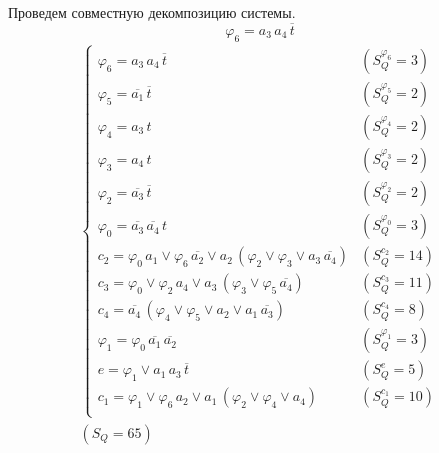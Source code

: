 \documentclass{article}
\begin{document}
\noindent\begin{minipage}{\textwidth}
Проведем совместную декомпозицию системы. \[\varphi_{6} = a_3\,a_4\,\overline{t}\]
\[\begin{matrix}
    \begin{cases}
        \varphi_{6} = a_3\,a_4\,\overline{t} & (S_Q^{\varphi_{6}} = 3) \\
        \varphi_{5} = \overline{a_1}\,\overline{t} & (S_Q^{\varphi_{5}} = 2) \\
        \varphi_{4} = a_3\,t & (S_Q^{\varphi_{4}} = 2) \\
        \varphi_{3} = a_4\,t & (S_Q^{\varphi_{3}} = 2) \\
        \varphi_{2} = \overline{a_3}\,\overline{t} & (S_Q^{\varphi_{2}} = 2) \\
        \varphi_{0} = \overline{a_3}\,\overline{a_4}\,t & (S_Q^{\varphi_{0}} = 3) \\
        c_2 = \varphi_{0}\,a_1 \lor \varphi_{6}\,\overline{a_2} \lor a_2\,\left(\varphi_{2} \lor \varphi_{3} \lor a_3\,\overline{a_4}\right) & (S_Q^{c_2} = 14) \\
        c_3 = \varphi_{0} \lor \varphi_{2}\,a_4 \lor a_3\,\left(\varphi_{3} \lor \varphi_{5}\,\overline{a_4}\right) & (S_Q^{c_3} = 11) \\
        c_4 = \overline{a_4}\,\left(\varphi_{4} \lor \varphi_{5} \lor a_2 \lor a_1\,\overline{a_3}\right) & (S_Q^{c_4} = 8) \\
        \varphi_{1} = \varphi_{0}\,\overline{a_1}\,\overline{a_2} & (S_Q^{\varphi_{1}} = 3) \\
        e = \varphi_{1} \lor a_1\,a_3\,\overline{t} & (S_Q^{e} = 5) \\
        c_1 = \varphi_{1} \lor \varphi_{6}\,a_2 \lor a_1\,\left(\varphi_{2} \lor \varphi_{4} \lor a_4\right) & (S_Q^{c_1} = 10) \\
    \end{cases} \\ (S_Q = 65)
\end{matrix}\] \\ \phantom{0}
\end{minipage}
\end{document}
